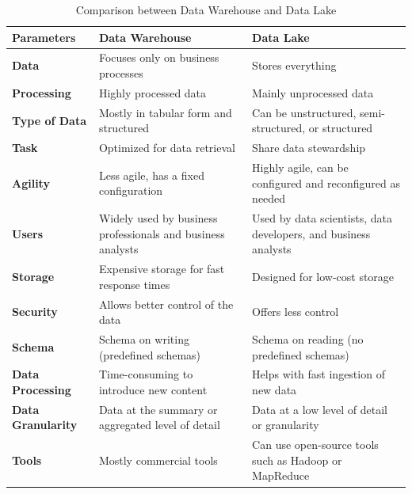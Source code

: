 \begin{table}[h!]
\centering
\begin{tabular}{|p{2.5cm}|p{6.25cm}|p{6.25cm}|}
\hline
\textbf{Parameters}        & \textbf{Data Warehouse}                                      & \textbf{Data Lake}  \\ \hline
\textbf{Data}              & Focuses only on business processes                           & Stores everything   \\ \hline
\textbf{Processing}        & Highly processed data                                        & Mainly unprocessed data                                     \\ \hline
\textbf{Type of Data}      & Mostly in tabular form and structured                        & Can be unstructured, semi-structured, or structured  \\ \hline
\textbf{Task}              & Optimized for data retrieval                                 & Share data stewardship  \\ \hline
\textbf{Agility}           & Less agile, has a fixed configuration                        & Highly agile, can be configured and reconfigured as needed \\ \hline
\textbf{Users}             & Widely used by business professionals and business analysts  & Used by data scientists, data developers, and business analysts  \\ \hline
\textbf{Storage}           & Expensive storage for fast response times                    & Designed for low-cost storage                                       \\ \hline
\textbf{Security}          & Allows better control of the data                            & Offers less control  \\ \hline
\textbf{Schema}            & Schema on writing (predefined schemas)                       & Schema on reading (no predefined schemas)                           \\ \hline
\textbf{Data Processing}   & Time-consuming to introduce new content                      & Helps with fast ingestion of new data                               \\ \hline
\textbf{Data Granularity}  & Data at the summary or aggregated level of detail            & Data at a low level of detail or granularity                        \\ \hline
\textbf{Tools}             & Mostly commercial tools                                      & Can use open-source tools such as Hadoop or MapReduce             \\ \hline
\end{tabular}
\caption{Comparison between Data Warehouse and Data Lake}
\label{tab:dataw}
\end{table}

